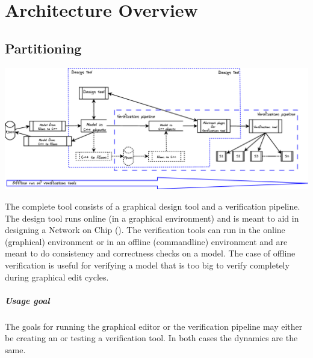 \chapter{Architecture Overview}



\section{Partitioning}

\begin{center}
	\includegraphics[width=.9\linewidth]{../architecture-tool-scope}
\end{center}

The complete tool consists of a graphical design tool and a verification pipeline.
The design tool runs online (in a graphical environment) and is meant to aid in 
designing a Network on Chip (\Noc). The verification tools can run in the online 
(graphical) environment or in an offline (commandline) environment and are meant 
to do consistency and correctness checks on a model.
The case of offline verification is useful for verifying a model that is 
too big to verify completely during graphical edit cycles.

\paragraph{Usage goal} The goals for running the graphical editor 
or the verification pipeline may either be creating an \Noc or 
testing a verification tool. In both cases the dynamics are the same.

